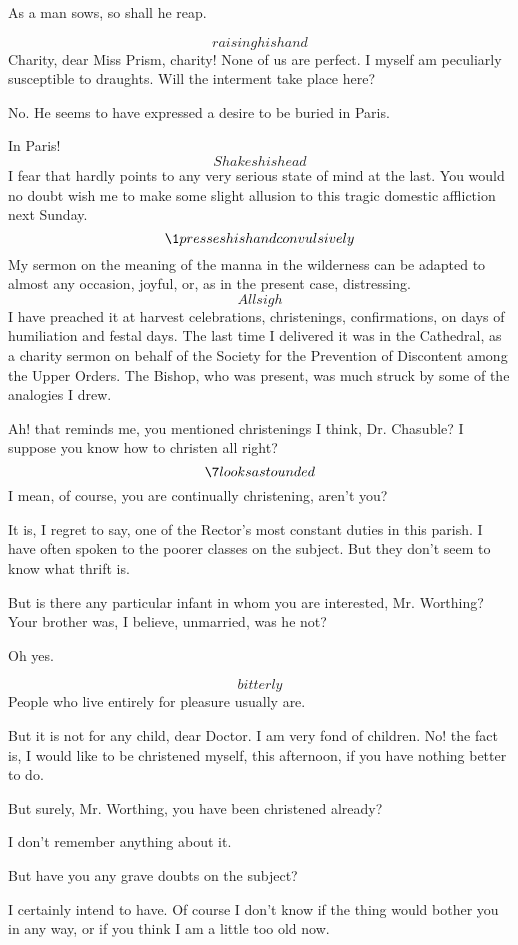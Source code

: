 \documentclass{book}
\begin{document}
\6  As a man sows, so shall he reap.

\7  \[raising his hand\]  Charity, dear Miss Prism, charity!
None of us are perfect.  I myself am peculiarly susceptible to
draughts.  Will the interment take place here?

\1  No.  He seems to have expressed a desire to be buried in
Paris.

\7  In Paris! \[Shakes his head\] I fear that hardly points
to any very serious state of mind at the last.  You would no doubt
wish me to make some slight allusion to this tragic domestic
affliction next Sunday. \[\1 presses his hand convulsively\]
My sermon on the meaning of the manna in the wilderness can be adapted
to almost any occasion, joyful, or, as in the present case,
distressing. \[All sigh\] I have preached it at harvest
celebrations, christenings, confirmations, on days of humiliation
and festal days.  The last time I delivered it was in the
Cathedral, as a charity sermon on behalf of the Society for the
Prevention of Discontent among the Upper Orders.  The Bishop, who
was present, was much struck by some of the analogies I drew.

\1  Ah! that reminds me, you mentioned christenings I think, Dr.
Chasuble?  I suppose you know how to christen all right?  \[\7
looks astounded\]  I mean, of course, you are continually
christening, aren't you?

\6  It is, I regret to say, one of the Rector's most
constant duties in this parish.  I have often spoken to the poorer
classes on the subject.  But they don't seem to know what thrift
is.

\7  But is there any particular infant in whom you are
interested, Mr. Worthing?  Your brother was, I believe, unmarried,
was he not?

\1  Oh yes.

\6  \[bitterly\]  People who live entirely for pleasure
usually are.

\1  But it is not for any child, dear Doctor.  I am very fond of
children.  No! the fact is, I would like to be christened myself,
this afternoon, if you have nothing better to do.

\7  But surely, Mr. Worthing, you have been christened
already?

\1  I don't remember anything about it.

\7  But have you any grave doubts on the subject?

\1  I certainly intend to have.  Of course I don't know if the
thing would bother you in any way, or if you think I am a little
too old now.
\end{document}
